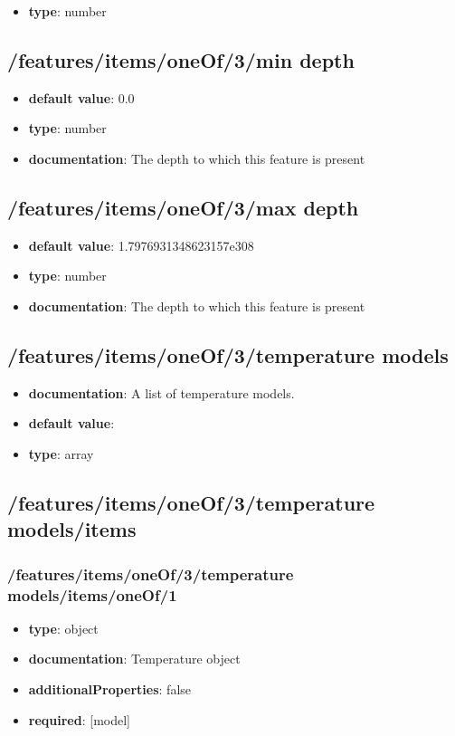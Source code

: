 \begin{itemize}\item {\bf type}: number
\end{itemize}\subsection{/features/items/oneOf/3/min depth}
\begin{itemize}\item {\bf default value}: 0.0
\item {\bf type}: number
\item {\bf documentation}: The depth to which this feature is present
\end{itemize}\subsection{/features/items/oneOf/3/max depth}
\begin{itemize}\item {\bf default value}: 1.7976931348623157e308
\item {\bf type}: number
\item {\bf documentation}: The depth to which this feature is present
\end{itemize}\subsection{/features/items/oneOf/3/temperature models}
\begin{itemize}\item {\bf documentation}: A list of temperature models.
\item {\bf default value}: 
\item {\bf type}: array
\end{itemize}\subsection{/features/items/oneOf/3/temperature models/items}

\subsubsection{/features/items/oneOf/3/temperature models/items/oneOf/1}
\begin{itemize}\item {\bf type}: object
\item {\bf documentation}: Temperature object
\item {\bf additionalProperties}: false
\item {\bf required}: [model]\end{itemize}
